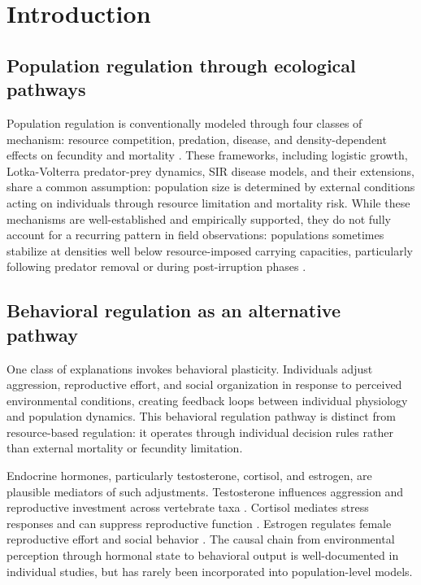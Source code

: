 \section{Introduction}

\subsection{Population regulation through ecological pathways}

Population regulation is conventionally modeled through four classes of mechanism: resource competition, predation, disease, and density-dependent effects on fecundity and mortality \citep{sinclair1989,hixon2002population}. These frameworks, including logistic growth, Lotka-Volterra predator-prey dynamics, SIR disease models, and their extensions, share a common assumption: population size is determined by external conditions acting on individuals through resource limitation and mortality risk. While these mechanisms are well-established and empirically supported, they do not fully account for a recurring pattern in field observations: populations sometimes stabilize at densities well below resource-imposed carrying capacities, particularly following predator removal or during post-irruption phases \citep{krebs1995impact,krebs2001}.

\subsection{Behavioral regulation as an alternative pathway}

One class of explanations invokes behavioral plasticity. Individuals adjust aggression, reproductive effort, and social organization in response to perceived environmental conditions, creating feedback loops between individual physiology and population dynamics. This behavioral regulation pathway is distinct from resource-based regulation: it operates through individual decision rules rather than external mortality or fecundity limitation.

Endocrine hormones, particularly testosterone, cortisol, and estrogen, are plausible mediators of such adjustments. Testosterone influences aggression and reproductive investment across vertebrate taxa \citep{wingfield1990,sapolsky2005}. Cortisol mediates stress responses and can suppress reproductive function \citep{creel2013}. Estrogen regulates female reproductive effort and social behavior \citep{ellison2003}. The causal chain from environmental perception through hormonal state to behavioral output is well-documented in individual studies, but has rarely been incorporated into population-level models.

